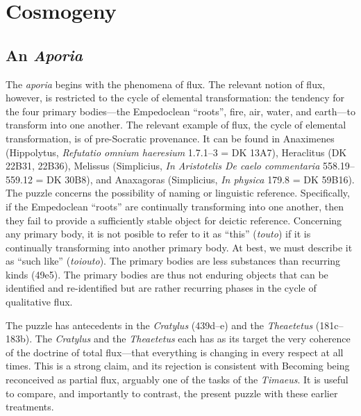 
\chapter{Cosmogeny} %
\label{cha:cosmogeny}

\section{An \emph{Aporia}} %
\label{sec:an_emph_aporia}

The \emph{aporia} begins with the phenomena of flux. The relevant notion of flux, however, is restricted to the cycle of elemental transformation: the tendency for the four primary bodies---the Empedoclean ``roots'', fire, air, water, and earth---to transform into one another. The relevant example of flux, the cycle of elemental transformation, is of pre-Socratic provenance. It can be found in Anaximenes (Hippolytus, \emph{Refutatio omnium haeresium} 1.7.1--3 = DK 13A7), Heraclitus (DK 22B31, 22B36), Melissus (Simplicius, \emph{In Aristotelis De caelo commentaria} 558.19--559.12 = DK 30B8), and Anaxagoras (Simplicius, \emph{In physica} 179.8 = DK 59B16). The puzzle concerns the possibility of naming or linguistic reference. Specifically, if the Empedoclean ``roots'' are continually transforming into one another, then they fail to provide a sufficiently stable object for deictic reference. Concerning any primary body, it is not posible to refer to it as ``this'' (\emph{touto}) if it is continually transforming into another primary body. At best, we must describe it as ``such like'' (\emph{toiouto}). The primary bodies are less substances than recurring kinds (49e5). The primary bodies are thus not enduring objects that can be identified and re-identified but are rather recurring phases in the cycle of qualitative flux.

The puzzle has antecedents in the \emph{Cratylus} (439d--e) and the \emph{Theaetetus} (181c--183b). The \emph{Cratylus} and the \emph{Theaetetus} each has as its target the very coherence of the doctrine of total flux---that everything is changing in every respect at all times. This is a strong claim, and its rejection is consistent with Becoming being reconceived as partial flux, arguably one of the tasks of the \emph{Timaeus}. It is useful to compare, and importantly to contrast, the present puzzle with these earlier treatments. 

